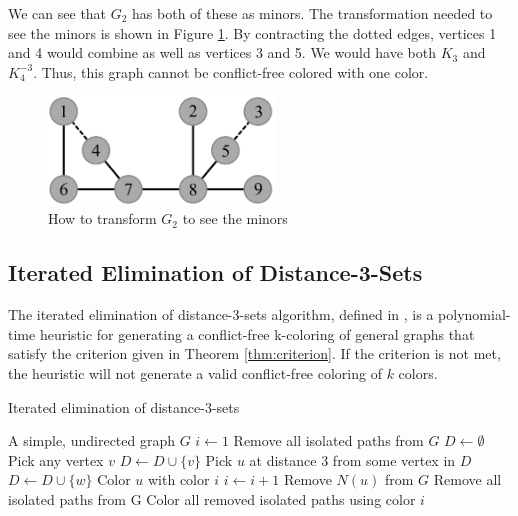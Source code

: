 \documentclass{sig-alternate}
\begin{document}
We can see that $G_2$ has both of these as minors. The transformation needed to see the minors is shown in Figure \ref{fig:criterion-minor}. By contracting the dotted edges, vertices 1 and 4 would combine as well as vertices 3 and 5. We would have both $K_{3}$ and $K_{4}^{-3}$. Thus, this graph cannot be conflict-free colored with one color.

\begin{figure}[h]
	\centering
	\includegraphics[width=6cm]{../figures/criterion-minor.pdf}
	\caption{How to transform $G_2$ to see the minors}\label{fig:criterion-minor}
\end{figure}

\vspace{-0.5cm}

\subsection{Iterated Elimination of Distance-3-Sets}
\label{sec:iterated}
The iterated elimination of distance-3-sets algorithm, defined in \cite{abel2017three}, is a polynomial-time heuristic for generating a conflict-free k-coloring of general graphs that satisfy the criterion given in Theorem \ref{thm:criterion}. If the criterion is not met, the heuristic will not generate a valid conflict-free coloring of $k$ colors.

\begin{algorithm}
\caption{Iterated elimination of distance-3-sets} \label{alg:elimination}
\begin{algorithmic}[1]
\Input A simple, undirected graph $G$
\State $i \gets 1$
\State Remove all isolated paths from $G$
	\State $D \gets \emptyset$
		\State Pick any vertex $v$
		\State $D \gets D \cup \{ v \}$
			\State Pick $u$ at distance 3 from some vertex in $D$
			\State $D \gets D \cup \{ w \}$
		\EndWhile
			\State Color $u$ with color $i$
		\EndFor
		\State $i \gets i + 1$
			\State Remove $N(u)$ from $G$
		\EndFor
		\State Remove all isolated paths from G
	\EndFor
\EndWhile
\State Color all removed isolated paths using color $i$
\end{algorithmic}
\end{algorithm}
\end{document}

